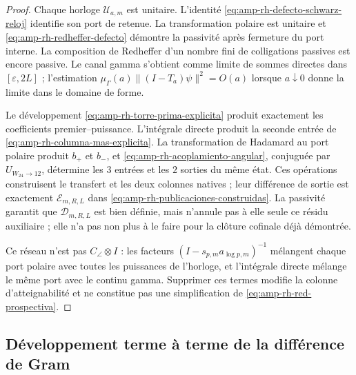 \begin{proof}
Chaque horloge \(\mathscr U_{a,m}\) est unitaire. L'identité \eqref{eq:amp-rh-defecto-schwarz-reloj} identifie son port de retenue. La transformation polaire est unitaire et \eqref{eq:amp-rh-redheffer-defecto} démontre la passivité après fermeture du port interne. La composition de Redheffer d'un nombre fini de colligations passives est encore passive. Le canal gamma s'obtient comme limite de sommes directes dans \([\varepsilon,2L]\) ; l'estimation \(\mu_\Gamma(a)\|(I-T_a)\psi\|^2=O(a)\) lorsque \(a\downarrow0\) donne la limite dans le domaine de forme.

Le développement \eqref{eq:amp-rh-torre-prima-explicita} produit exactement les coefficients premier--puissance. L'intégrale directe produit la seconde entrée de \eqref{eq:amp-rh-columna-mas-explicita}. La transformation de Hadamard au port polaire produit \(b_+\) et \(b_-\), et \eqref{eq:amp-rh-acoplamiento-angular}, conjuguée par \(U_{W_{24}\to12}\), détermine les \(3\) entrées et les \(2\) sorties du même état. Ces opérations construisent le transfert et les deux colonnes natives ; leur différence de sortie est exactement \(\mathcal E_{m,R,L}\) dans \eqref{eq:amp-rh-publicaciones-construidas}. La passivité garantit que \(\mathscr D_{m,R,L}\) est bien définie, mais n'annule pas à elle seule ce résidu auxiliaire ; elle n'a pas non plus à le faire pour la clôture cofinale déjà démontrée.

Ce réseau n'est pas \(C_\angle\otimes I\) : les facteurs \((I-s_{p,m}a_{\log p,m})^{-1}\) mélangent chaque port polaire avec toutes les puissances de l'horloge, et l'intégrale directe mélange le même port avec le continu gamma. Supprimer ces termes modifie la colonne d'atteignabilité et ne constitue pas une simplification de \eqref{eq:amp-rh-red-prospectiva}.
\end{proof}

\subsection*{Développement terme à terme de la différence de Gram}

